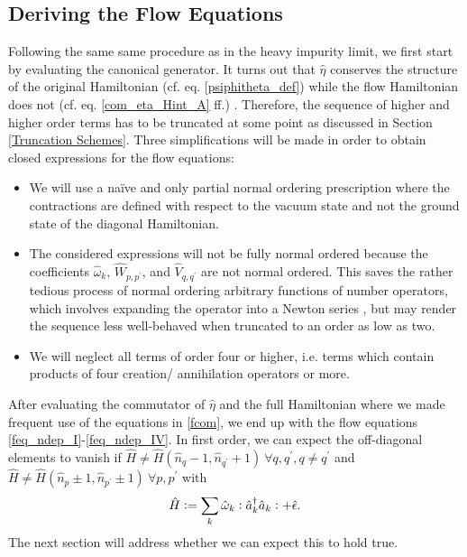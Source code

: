 \subsection{Deriving the Flow Equations}
Following the same same procedure as in the heavy impurity limit, we first start by evaluating the canonical generator. It turns out that $\hat\eta$ conserves the structure of the original Hamiltonian (cf. eq. \ref{psiphitheta_def}) while the flow Hamiltonian does not (cf. eq. \ref{com_eta_Hint_A} ff.) . Therefore, the sequence of higher and higher order terms has to be truncated at some point as discussed in Section \ref{Truncation Schemes}. 
Three simplifications will be made in order to obtain closed expressions for the flow equations:
\begin{itemize}
\item We will use a na\"ive and only partial normal ordering prescription where the contractions are defined with respect to the vacuum state and not the ground state of the diagonal Hamiltonian.
\item The considered expressions will not be fully normal ordered because the coefficients $\hat\omega_k $, $\hat W_{p,p^\prime}$, and $\hat V_{q,q^\prime}$ are not normal ordered. This saves the rather tedious process of normal ordering arbitrary functions of number operators, which involves expanding the operator into a Newton series \cite{10.21468/SciPostPhys.10.1.007}, but may render the sequence less well-behaved when truncated to an order as low as two.
\item  We will neglect all terms of order four or higher, i.e. terms which contain products of four creation/ annihilation operators or more.
\end{itemize}
After evaluating the commutator of $\hat\eta$ and the full Hamiltonian where we made frequent use of the equations in \ref{fcom}, we end up with the flow equations \ref{feq_ndep_I}-\ref{feq_ndep_IV}. In first order, we can expect the off-diagonal elements to vanish if $\hat H \neq \hat H(\hat n_q-1,\hat n_{q^\prime}+1)\ \forall q,q^\prime,q\neq q^\prime$ and $\hat H \neq \hat H(\hat n_p\pm 1,\hat n_{p^\prime}\pm 1)\ \forall p,p^\prime$ with \begin{equation}\hat H\vcentcolon= \sum\limits_k \hat\omega_k \vcentcolon\hat a^\dagger_k\hat a_k\vcentcolon+\hat\epsilon. \end{equation}
The next section will address whether we can expect this to hold true.


